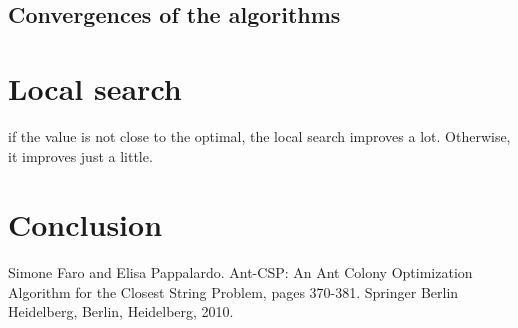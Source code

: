 \documentclass{article}
\begin{document}
\subsection{Convergences of the algorithms}



\section{Local search}

if the value is not close to the optimal, the local search improves a lot.
Otherwise, it improves just a little.


\section*{Conclusion}

\begin{thebibliography}{2}

 Simone Faro and Elisa Pappalardo.
Ant-CSP: An Ant Colony Optimization Algorithm for the Closest String Problem, pages 370-381.
Springer Berlin
Heidelberg, Berlin, Heidelberg, 2010.

\end{thebibliography}
\end{document}
